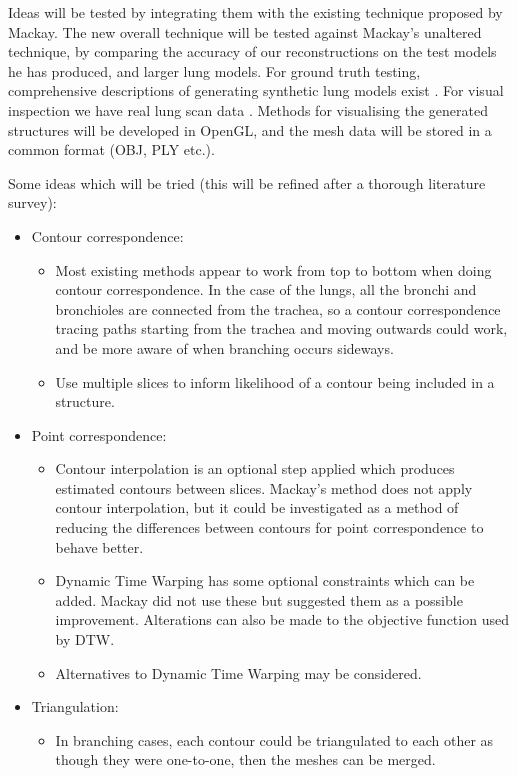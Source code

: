 \documentclass[12pt]{article}
\begin{document}
Ideas will be tested by integrating them with the existing technique proposed by Mackay. The new overall technique will be tested against Mackay’s unaltered technique, by comparing the accuracy of our reconstructions on the test models he has produced, and larger lung models. For ground truth testing, comprehensive descriptions of generating synthetic lung models exist \cite{pluta2012new}. For visual inspection we have real lung scan data \cite{mukundan2016reconstruction}. Methods for visualising the generated structures will be developed in OpenGL, and the mesh data will be stored in a common format (OBJ, PLY etc.). 

Some ideas which will be tried (this will be refined after a thorough literature survey):
\begin{itemize}
\item Contour correspondence:
\begin{itemize}
\item Most existing methods appear to work from top to bottom when doing contour correspondence. In the case of the lungs, all the bronchi and bronchioles are connected from the trachea, so a contour correspondence tracing paths starting from the trachea and moving outwards could work, and be more aware of when branching occurs sideways.
\item Use multiple slices to inform likelihood of a contour being included in a structure.
\end{itemize}

\item Point correspondence:
\begin{itemize}
\item Contour interpolation is an optional step applied which produces estimated contours between slices. Mackay’s method does not apply contour interpolation, but it could be investigated as a method of reducing the differences between contours for point correspondence to behave better.
\item Dynamic Time Warping has some optional constraints which can be added. Mackay did not use these but suggested them as a possible improvement. Alterations can also be made to the objective function used by DTW.
\item Alternatives to Dynamic Time Warping may be considered.
\end{itemize}

\item Triangulation:
\begin{itemize}
\item In branching cases, each contour could be triangulated to each other as though they were one-to-one, then the meshes can be merged.
\end{itemize}
\end{itemize}
\end{document}
